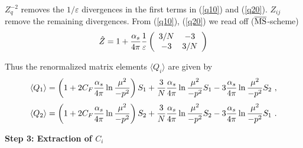 \documentclass[12pt,rotate]{article}
\def\eps{\varepsilon}
\def\as{\alpha_s}
\newcommand{\eqn}{\ref}
\def\aspi{\frac{\as}{4\pi}}
\begin{document}
\begin{itemize}
\begin{itemize}
\begin{itemize}
$Z^{-2}_q$ removes the $1/\varepsilon$ divergences in the
first terms in (\eqn{q10}) and (\eqn{q20}). $Z_{ij}$ remove
the remaining divergences.
From (\eqn{q10}), (\eqn{q20})  we read off 
($\overline{\rm MS}$-scheme)
\begin{equation}\label{zll} \hat Z = 1+ \aspi {1\over\eps}
 \left(\begin{array}{cc}  3/N & -3 \\
                          -3 & 3/N
    \end{array}\right)   \end{equation}

Thus the renormalized matrix elements $\langle Q_i\rangle$
are given by
\begin{equation}\label{q1re}
\langle Q_1\rangle=\left(1+2C_F \aspi\ln{\mu^2\over -p^2}
\right)S_1+{3\over N}\aspi\ln{\mu^2\over -p^2}S_1-
3\aspi\ln{\mu^2\over -p^2} S_2~,   \end{equation}
\begin{equation}\label{q2re}
\langle Q_2\rangle=\left(1+2C_F \aspi\ln{\mu^2\over -p^2}
\right)S_2+{3\over N}\aspi\ln{\mu^2\over -p^2}S_2-
3\aspi\ln{\mu^2\over -p^2} S_1~.   \end{equation}

{\bf Step 3: Extraction of $C_i$}


\end{itemize}
\end{itemize}
\end{itemize}
\end{document}
